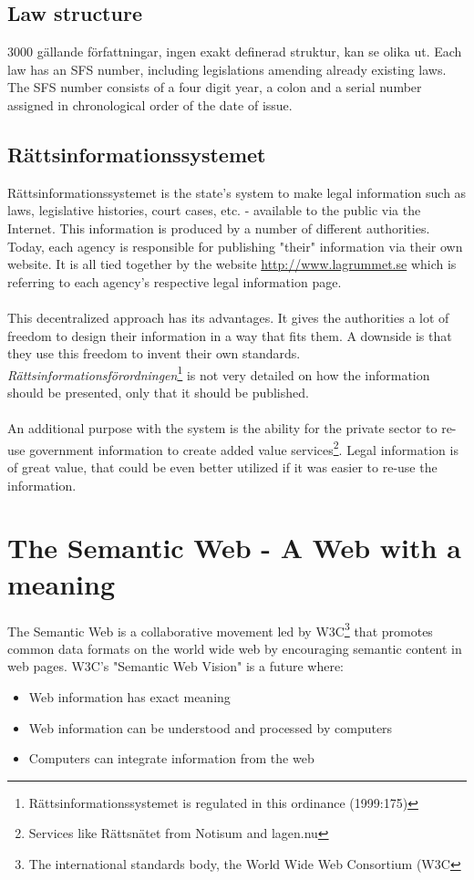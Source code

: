 \documentclass[a4paper,11pt]{kth-mag}
\begin{document}
\subsection{Law structure}
3000 gällande författningar, ingen exakt definerad struktur, kan se olika ut. 
Each law has an SFS number, including legislations amending already existing laws. The SFS number consists of a four digit year, a colon and a serial number assigned in chronological order of the date of issue. 

\subsection{Rättsinformationssystemet}
Rättsinformationssystemet is the state's system to make legal information such as laws, legislative histories, court cases, etc. - available to the public via the Internet. This information is produced by a number of different authorities. Today, each agency is responsible for publishing "their" information via their own website. It is all tied together by the website \url{http://www.lagrummet.se} which is referring to each agency's respective legal information page.\\\\
This decentralized approach has its advantages. It gives the authorities a lot of freedom to design their information in a way that fits them. A downside is that they use this freedom to invent their own standards. \textit{Rättsinformationsförordningen}\footnote{Rättsinformationssystemet is regulated in this ordinance (1999:175)} is not very detailed on how the information should be presented, only that it should be published.\\\\
An additional purpose with the system is the ability for the private sector to re-use government information to create added value services\footnote{Services like Rättsnätet from Notisum and lagen.nu}. Legal information is of great value, that could be even better utilized if it was easier to re-use the information.

\section{The Semantic Web - A Web with a meaning} 
The Semantic Web is a collaborative movement led by W3C\footnote{The international standards body, the World Wide Web Consortium (W3C} that promotes common data formats on the world wide web by encouraging semantic content in web pages. W3C's "Semantic Web Vision" is a future where: 
\begin{itemize}
\item Web information has exact meaning
\item Web information can be understood and processed by computers
\item Computers can integrate information from the web 
\end{itemize}
\end{document}
